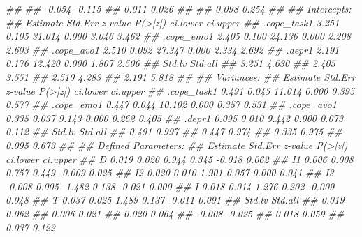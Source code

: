 \documentclass[
  chinese-hans,
  letterpaper,
  DIV=11,
  numbers=noendperiod]{scrartcl}
\newenvironment{Shaded}{\begin{snugshade}}{\end{snugshade}}
\newcommand{\DocumentationTok}[1]{\textcolor[rgb]{0.37,0.37,0.37}{\textit{#1}}}
\begin{document}
\begin{Shaded}
\begin{Highlighting}[numbers=left,,]
\DocumentationTok{\#\#                   }
\DocumentationTok{\#\#    {-}0.054   {-}0.115}
\DocumentationTok{\#\#     0.011    0.026}
\DocumentationTok{\#\#                   }
\DocumentationTok{\#\#     0.098    0.254}
\DocumentationTok{\#\# }
\DocumentationTok{\#\# Intercepts:}
\DocumentationTok{\#\#                    Estimate  Std.Err  z{-}value  P(\textgreater{}|z|) ci.lower ci.upper}
\DocumentationTok{\#\#    .cope\_task1        3.251    0.105   31.014    0.000    3.046    3.462}
\DocumentationTok{\#\#    .cope\_emo1         2.405    0.100   24.136    0.000    2.208    2.603}
\DocumentationTok{\#\#    .cope\_avo1         2.510    0.092   27.347    0.000    2.334    2.692}
\DocumentationTok{\#\#    .depr1             2.191    0.176   12.420    0.000    1.807    2.506}
\DocumentationTok{\#\#    Std.lv  Std.all}
\DocumentationTok{\#\#     3.251    4.630}
\DocumentationTok{\#\#     2.405    3.551}
\DocumentationTok{\#\#     2.510    4.283}
\DocumentationTok{\#\#     2.191    5.818}
\DocumentationTok{\#\# }
\DocumentationTok{\#\# Variances:}
\DocumentationTok{\#\#                    Estimate  Std.Err  z{-}value  P(\textgreater{}|z|) ci.lower ci.upper}
\DocumentationTok{\#\#    .cope\_task1        0.491    0.045   11.014    0.000    0.395    0.577}
\DocumentationTok{\#\#    .cope\_emo1         0.447    0.044   10.102    0.000    0.357    0.531}
\DocumentationTok{\#\#    .cope\_avo1         0.335    0.037    9.143    0.000    0.262    0.405}
\DocumentationTok{\#\#    .depr1             0.095    0.010    9.442    0.000    0.073    0.112}
\DocumentationTok{\#\#    Std.lv  Std.all}
\DocumentationTok{\#\#     0.491    0.997}
\DocumentationTok{\#\#     0.447    0.974}
\DocumentationTok{\#\#     0.335    0.975}
\DocumentationTok{\#\#     0.095    0.673}
\DocumentationTok{\#\# }
\DocumentationTok{\#\# Defined Parameters:}
\DocumentationTok{\#\#                    Estimate  Std.Err  z{-}value  P(\textgreater{}|z|) ci.lower ci.upper}
\DocumentationTok{\#\#     D                 0.019    0.020    0.944    0.345   {-}0.018    0.062}
\DocumentationTok{\#\#     I1                0.006    0.008    0.757    0.449   {-}0.009    0.025}
\DocumentationTok{\#\#     I2                0.020    0.010    1.901    0.057    0.000    0.041}
\DocumentationTok{\#\#     I3               {-}0.008    0.005   {-}1.482    0.138   {-}0.021    0.000}
\DocumentationTok{\#\#     I                 0.018    0.014    1.276    0.202   {-}0.009    0.048}
\DocumentationTok{\#\#     T                 0.037    0.025    1.489    0.137   {-}0.011    0.091}
\DocumentationTok{\#\#    Std.lv  Std.all}
\DocumentationTok{\#\#     0.019    0.062}
\DocumentationTok{\#\#     0.006    0.021}
\DocumentationTok{\#\#     0.020    0.064}
\DocumentationTok{\#\#    {-}0.008   {-}0.025}
\DocumentationTok{\#\#     0.018    0.059}
\DocumentationTok{\#\#     0.037    0.122}
\end{Highlighting}
\end{Shaded}
\end{document}
